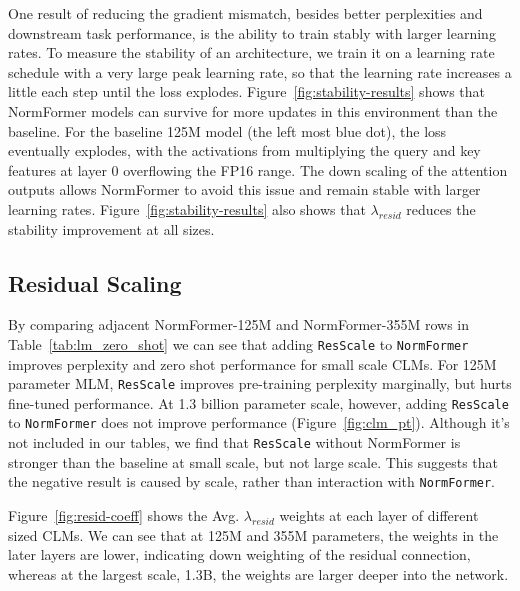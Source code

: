\documentclass{article} %
\begin{document}
One result of reducing the gradient mismatch, besides better perplexities and downstream task performance, is the ability to train stably with larger learning rates.
To measure the stability of an architecture, we train it on a learning rate schedule with a very large peak learning rate, so that the learning rate increases a little each step until the loss explodes. Figure~\ref{fig:stability-results} shows that NormFormer models can survive for more updates in this environment than the baseline. For the baseline 125M model (the left most blue dot), the loss eventually explodes, with the activations from multiplying the query and key features at layer 0 overflowing the FP16 range. The down scaling of the attention outputs allows NormFormer to avoid this issue and remain stable with larger learning rates.  Figure~\ref{fig:stability-results} also shows that $\lambda_{resid}$ reduces the stability improvement at all sizes.

\subsection{Residual Scaling}
\label{sec:res-scale}
By comparing adjacent NormFormer-125M and NormFormer-355M rows in Table~\ref{tab:lm_zero_shot} we can see that adding \texttt{ResScale} to \texttt{NormFormer} improves perplexity and zero shot performance for small scale CLMs. For 125M parameter MLM, \texttt{ResScale} improves pre-training perplexity marginally, but hurts fine-tuned performance.  At 1.3 billion parameter scale, however, adding \texttt{ResScale} to \texttt{NormFormer} does not improve performance (Figure~\ref{fig:clm_pt}). Although it’s not included in our tables, we find that \texttt{ResScale} without NormFormer is stronger than the baseline at small scale, but not large scale. This suggests that the negative result is caused by scale, rather than interaction with \texttt{NormFormer}.

Figure~\ref{fig:resid-coeff} shows the Avg. $\lambda_{resid}$ weights at each layer of different sized CLMs. We can see that at 125M and 355M parameters, the weights in the later layers are lower, indicating down weighting of the residual connection, whereas at the largest scale, 1.3B, the weights are larger deeper into the network.
\end{document}
